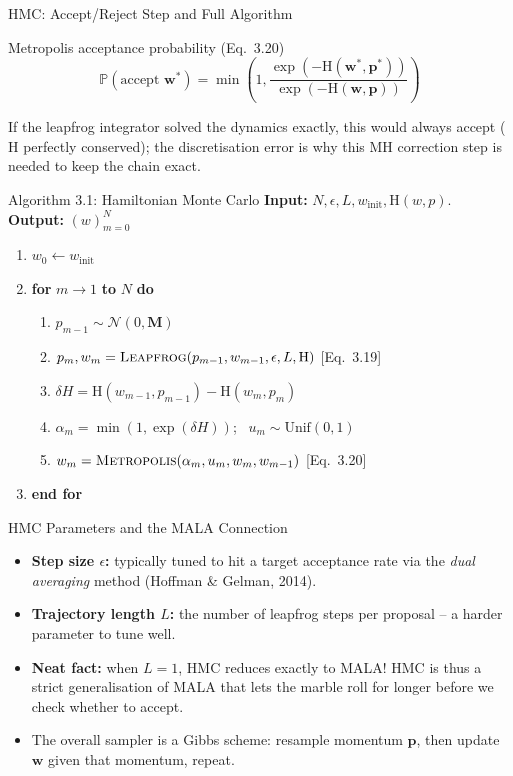 \documentclass[aspectratio=169,10pt]{beamer}
\newcommand{\bw}{\mathbf{w}}
\newcommand{\bp}{\mathbf{p}}
\newcommand{\Prob}{\mathbb{P}}
\newcommand{\Ham}{\mathrm{H}}
\begin{document}
\begin{frame}{HMC: Accept/Reject Step and Full Algorithm}
  \footnotesize
  \begin{block}{Metropolis acceptance probability (Eq.~3.20)}
  \begin{equation}
    \Prob(\text{accept } \bw^*) = \min\left(1, \frac{\exp(-\Ham(\bw^*,\bp^*))}{\exp(-\Ham(\bw,\bp))}\right)
  \end{equation}
  \end{block}
  If the leapfrog integrator solved the dynamics exactly, this would always
  accept ($\Ham$ perfectly conserved); the discretisation error is why this
  MH correction step is needed to keep the chain exact.

  \begin{block}{Algorithm 3.1: Hamiltonian Monte Carlo}
  \textbf{Input:} $N, \epsilon, L, w_{\text{init}}, \Ham(w,p)$. \quad
  \textbf{Output:} $(w)_{m=0}^{N}$
  \begin{enumerate}
    \setlength\itemsep{0pt}
    \item $w_0 \leftarrow w_{\text{init}}$
    \item \textbf{for} $m \to 1$ \textbf{to} $N$ \textbf{do}
    \begin{enumerate}
      \setlength\itemsep{0pt}
      \item[3.1] $p_{m-1} \sim \mathcal{N}(0,\mathbf{M})$
      \item[3.2] $p_m, w_m = \textsc{Leapfrog}(p_{m-1}, w_{m-1}, \epsilon, L, \Ham)$ [Eq.~3.19]
      \item[3.3] $\delta H = \Ham(w_{m-1},p_{m-1}) - \Ham(w_m,p_m)$
      \item[3.4] $\alpha_m = \min(1, \exp(\delta H))$; \ $u_m \sim \text{Unif}(0,1)$
      \item[3.5] $w_m = \textsc{Metropolis}(\alpha_m, u_m, w_m, w_{m-1})$ [Eq.~3.20]
    \end{enumerate}
    \item \textbf{end for}
  \end{enumerate}
  \end{block}
\end{frame}

\begin{frame}{HMC Parameters and the MALA Connection}
  \begin{itemize}
    \item \textbf{Step size $\epsilon$:} typically tuned to hit a target
      acceptance rate via the \emph{dual averaging} method (Hoffman \&
      Gelman, 2014).
    \item \textbf{Trajectory length $L$:} the number of leapfrog steps per
      proposal -- a harder parameter to tune well.
    \item \textbf{Neat fact:} when $L=1$, HMC reduces exactly to MALA! HMC is
      thus a strict generalisation of MALA that lets the marble roll for
      longer before we check whether to accept.
    \item The overall sampler is a Gibbs scheme: resample momentum $\bp$,
      then update $\bw$ given that momentum, repeat.
  \end{itemize}
\end{frame}
\end{document}
